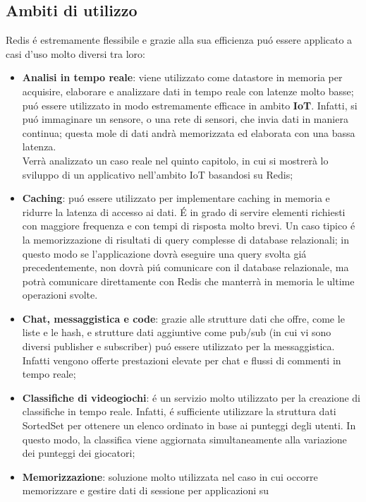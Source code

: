 \subsection{Ambiti di utilizzo}
Redis é estremamente flessibile e grazie alla sua efficienza puó essere applicato a casi d'uso molto diversi tra loro:
\begin{itemize}
    \item \textbf{Analisi in tempo reale}: viene utilizzato come datastore in memoria per acquisire, elaborare e analizzare dati in tempo reale
    con latenze molto basse; puó essere utilizzato in modo estremamente efficace in ambito \textbf{IoT}. Infatti, si puó immaginare un sensore, o una rete di sensori, che invia
    dati in maniera continua; questa mole di dati andrà memorizzata ed elaborata con una bassa latenza.\\
    Verrà analizzato un caso reale nel quinto capitolo, in cui si mostrerà lo sviluppo di un applicativo nell'ambito
    IoT basandosi su Redis;
    \item \textbf{Caching}: puó essere utilizzato per implementare caching in memoria e ridurre la latenza di accesso ai dati. É in grado
    di servire elementi richiesti con maggiore frequenza e con tempi di risposta molto brevi. Un caso tipico é la memorizzazione
    di risultati di query complesse di database relazionali; in questo modo se l'applicazione dovrà eseguire una query svolta giá precedentemente,
    non dovrà piú comunicare con il database relazionale, ma potrà comunicare direttamente con Redis che manterrà in memoria le ultime operazioni svolte.
    \item \textbf{Chat, messaggistica e code}: grazie alle strutture dati che offre, come le liste e le hash, e strutture dati aggiuntive come pub/sub
    (in cui vi sono diversi publisher e subscriber) puó essere utilizzato per la messaggistica. Infatti vengono offerte prestazioni elevate per
    chat e flussi di commenti in tempo reale;
    \item \textbf{Classifiche di videogiochi}: é un servizio molto utilizzato per la creazione di classifiche in tempo reale. Infatti, é
    sufficiente utilizzare la struttura dati SortedSet per ottenere un elenco ordinato in base ai punteggi degli utenti. In questo modo, la classifica
    viene aggiornata simultaneamente alla variazione dei punteggi dei giocatori;
    \item \textbf{Memorizzazione}: soluzione molto utilizzata nel caso in cui occorre memorizzare e gestire dati di sessione per applicazioni su

\end{itemize}
